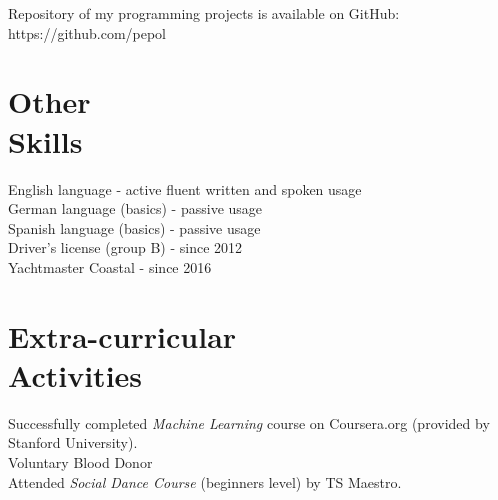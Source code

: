 \documentclass[margin]{res}
\begin{document}
\begin{resume}
Repository of my programming projects is available on GitHub: https://github.com/pepol

\section{Other \\ Skills}
English language - active fluent written and spoken usage \\
German language (basics) - passive usage \\
Spanish language (basics) - passive usage \\
Driver's license (group B) - since 2012 \\
Yachtmaster Coastal - since 2016

\section{Extra-curricular \\ Activities}
Successfully completed {\it Machine Learning} course on Coursera.org (provided by Stanford University). \\
Voluntary Blood Donor \\
Attended {\it Social Dance Course} (beginners level) by TS Maestro.
\end{resume}
\end{document}
